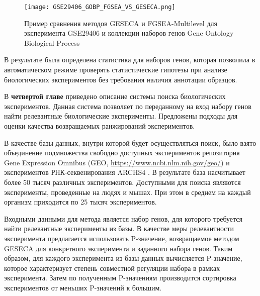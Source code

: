 \begin{figure}[h!]
    \texttt{[image: GSE29406\_GOBP\_FGSEA\_VS\_GESECA.png]}
    \centering
    \caption{Пример сравнения методов GESECA и FGSEA-Multilevel для эксперимента GSE29406 и коллекции наборов генов Gene Ontology Biological Process}
    \label{fig:geseca_vs_fgsea}
\end{figure}



В результате была определена статистика для наборов генов, которая позволила в автоматическом режиме проверять статистические гипотезы при анализе биологических экспериментов без требования наличия аннотации образцов.




В \textbf{четвертой главе} приведено описание системы поиска биологических экспериментов.
Данная система позволяет по переданному на вход набору генов найти релевантные биологические эксперименты.
Предложены подходы для оценки качества возвращаемых ранжирований экспериментов.

В качестве базы данных, внутри которой будет осуществляться поиск, было взято объединение подмножества свободно доступных экспериментов репозитория Gene Expression Omnibus (GEO, \url{https://www.ncbi.nlm.nih.gov/geo/}) и экспериментов РНК-секвенирования ARCHS4 \cite{lachmann2018massive}.
В результате база насчитывает более 50 тысяч различных экспериментов.
Доступными для поиска являются эксперименты, проведенные на людях и мышах.
При этом в среднем на каждый организм приходится по 25 тысяч экспериментов.

Входными данными для метода является набор генов, для которого требуется найти релевантные эксперименты из базы.
В качестве меры релевантности эксперимента предлагается использовать P-значение, возвращаемое методом GESECA для конкретного эксперимента и заданного набора генов.
Таким образом, для каждого эксперимента из базы данных вычисляется P-значение, которое характеризует степень совместной регуляции набора в рамках эксперимента.
Затем по полученным P-значениям производится сортировка экспериментов от меньших P-значений к большим.

